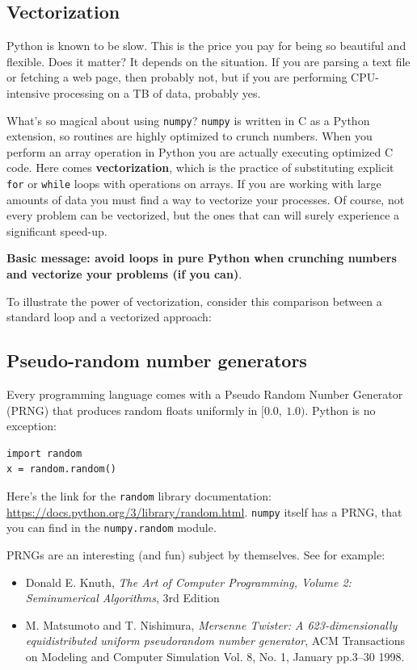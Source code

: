 

\subsection{Vectorization}

Python is known to be slow. This is the price you pay for being so beautiful and flexible. Does it matter? It depends on the situation. If you are parsing a text file or fetching a web page, then probably not, but if you are performing CPU-intensive processing on a TB of data, probably yes.

What's so magical about using \texttt{numpy}? \texttt{numpy} is written in C as a Python extension, so routines are highly optimized to crunch numbers. When you perform an array operation in Python you are actually executing optimized C code. Here comes \textbf{vectorization}, which is the practice of substituting explicit \texttt{for} or \texttt{while} loops with operations on arrays. If you are working with large amounts of data you must find a way to vectorize your processes. Of course, not every problem can be vectorized, but the ones that can will surely experience a significant speed-up.

\textbf{Basic message: avoid loops in pure Python when crunching numbers and vectorize your problems (if you can)}.

To illustrate the power of vectorization, consider this comparison between a standard loop and a vectorized approach:



\subsection{Pseudo-random number generators}
Every programming language comes with a Pseudo Random Number Generator (PRNG) that produces random floats uniformly in $[0.0,~1.0)$. Python is no exception: 
\begin{verbatim}
import random
x = random.random()
\end{verbatim}
Here's the link for the \texttt{random} library documentation: \url{https://docs.python.org/3/library/random.html}. \texttt{numpy} itself has a PRNG, that you can find in the \texttt{numpy.random} module.

PRNGs are an interesting (and fun) subject by themselves. See for example:
\begin{itemize}
    \item[-] Donald E. Knuth, \emph{The Art of Computer Programming, Volume 2: Seminumerical Algorithms}, 3rd Edition
    \item[-] M. Matsumoto and T. Nishimura, \emph{Mersenne Twister: A 623-dimensionally equidistributed uniform pseudorandom number generator}, ACM Transactions on Modeling and Computer Simulation Vol. 8, No. 1, January pp.3--30 1998.
\end{itemize}


